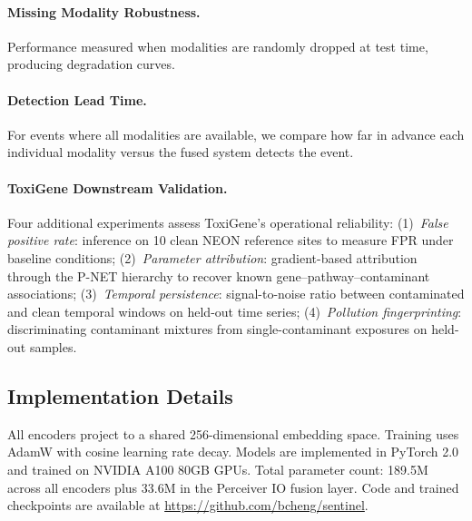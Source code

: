 \paragraph{Missing Modality Robustness.}
Performance measured when modalities are randomly dropped at test time,
producing degradation curves.

\paragraph{Detection Lead Time.}
For events where all modalities are available, we compare how far in
advance each individual modality versus the fused system detects the event.

\paragraph{ToxiGene Downstream Validation.}
Four additional experiments assess ToxiGene's operational reliability:
(1)~\emph{False positive rate}: inference on 10 clean NEON reference sites
to measure FPR under baseline conditions;
(2)~\emph{Parameter attribution}: gradient-based attribution through the
P-NET hierarchy to recover known gene--pathway--contaminant associations;
(3)~\emph{Temporal persistence}: signal-to-noise ratio between contaminated
and clean temporal windows on held-out time series;
(4)~\emph{Pollution fingerprinting}: discriminating contaminant mixtures
from single-contaminant exposures on held-out samples.

\subsection{Implementation Details}

All encoders project to a shared 256-dimensional embedding space.
Training uses AdamW with cosine learning rate decay. Models are
implemented in PyTorch 2.0 and trained on NVIDIA A100 80GB GPUs.
Total parameter count: 189.5M across all encoders plus 33.6M in the
Perceiver IO fusion layer. Code and trained checkpoints are available
at \url{https://github.com/bcheng/sentinel}.
